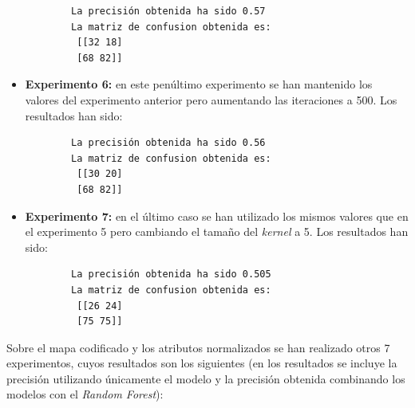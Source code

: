 \begin{itemize}
    \begin{verbatim}
        La precisión obtenida ha sido 0.57
        La matriz de confusion obtenida es:
         [[32 18]
         [68 82]]
    \end{verbatim}
    \item \textbf{Experimento 6:} en este penúltimo experimento se han mantenido los valores del experimento anterior pero aumentando las iteraciones a 500. Los resultados han sido:
    \begin{verbatim}
        La precisión obtenida ha sido 0.56
        La matriz de confusion obtenida es:
         [[30 20]
         [68 82]]
    \end{verbatim}
    \item \textbf{Experimento 7:} en el último caso se han utilizado los mismos valores que en el experimento 5 pero cambiando el tamaño del \emph{kernel} a 5. Los resultados han sido:
    \begin{verbatim}
        La precisión obtenida ha sido 0.505
        La matriz de confusion obtenida es:
         [[26 24]
         [75 75]]
    \end{verbatim}
\end{itemize}

Sobre el mapa codificado y los atributos normalizados se han realizado otros 7 experimentos, cuyos resultados son los siguientes (en los resultados se incluye la precisión utilizando únicamente el modelo y la precisión obtenida combinando los modelos con el \emph{Random Forest}):

